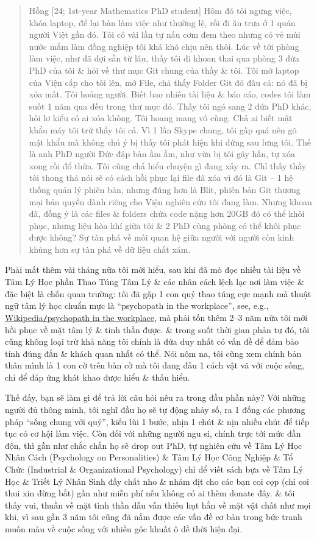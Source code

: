 \documentclass[12pt,twoside]{book}
\begin{document}
\begin{quote}
	{\sf Hồng [24; 1st-year Mathematics PhD student]} Hôm đó tôi ngưng việc, khóa laptop, để lại bàn làm việc  như thường lệ, rồi đi ăn trưa ở 1 quán người Việt gần đó. Tôi có vài lần tự nấu cơm đem theo nhưng có vẻ mùi nước mắm làm đồng nghiệp tôi khá khó chịu nên thôi. Lúc về tới phòng làm việc, như đã đợi sẵn từ lâu, thầy tôi đi khoan thai qua phòng 3 đứa PhD của tôi \& hỏi về thư mục Git chung của thầy \& tôi. Tôi mở laptop của Viện cấp cho tôi lên, mở File, chả thấy Folder Git đó đâu cả: nó đã bị xóa mất. Tôi hoảng người. Biết bao nhiêu tài liệu \& báo cáo, codes tôi làm suốt 1 năm qua đều trong thư mục đó. Thầy tôi ngó sang 2 đứa PhD khác, hỏi lơ kiểu có ai xóa không. Tôi hoang mang vô cùng. Chả ai biết mật khẩu máy tôi trừ thầy tôi cả. Vì 1 lần Skype chung, tôi gấp quá nên gõ mật khẩu mà không chú ý bị thầy tôi phát hiện khi đứng sau lưng tôi. Thế là anh PhD người Đức đập bàn ầm ầm, như vừa bị tôi gây hấn, tự xóa xong rồi đổ thừa. Tôi cũng chả hiểu chuyện gì đang xảy ra. Chỉ thấy thầy tôi thong thả nói sẽ có cách hồi phục lại file đã xóa vì đó là Git -- 1 hệ thống quản lý phiên bản, nhưng đúng hơn là Blit, phiên bản Git thương mại bản quyền dành riêng cho Viện nghiên cứu tôi đang làm. Nhưng khoan đã, đồng ý là các files \& folders chứa code nặng hơn 20GB đó có thể khôi phục, nhưng liệu hòa khí giữa tôi \& 2 PhD cùng phòng có thể khôi phục được không? Sự tàn phá về mối quan hệ giữa người với người còn kinh khủng hơn sự tàn phá về dữ liệu chất xám.
\end{quote}
Phải mất thêm vài tháng nữa tôi mới hiểu, sau khi đã mò đọc nhiều tài liệu về Tâm Lý Học phần Thao Túng Tâm Lý \& các nhân cách lệch lạc nơi làm việc \& đặc biệt là chốn quan trường: tôi đã gặp 1 con quỷ thao túng cực mạnh mà thuật ngữ tâm lý học chuẩn mực là ``psychopath in the workplace'', see, e.g., \href{https://en.wikipedia.org/wiki/Psychopathy_in_the_workplace}{Wikipedia{\tt/}psychopath in the workplace}, mà phải tốn thêm 2--3 năm nữa tôi mới hồi phục về mặt tâm lý \& tinh thần được. \& trong suốt thời gian phản tư đó, tôi cũng không loại trừ khả năng tôi chính là đứa duy nhất có vấn đề để đảm bảo tính đúng đắn \& khách quan nhất có thể. Nói nôm na, tôi cũng xem chính bản thân mình là 1 con cờ trên bàn cờ mà tôi đang đấu 1 cách vật vã với cuộc sống, chỉ để đáp ứng khát khao được hiểu \& thấu hiểu.

Thế đấy, bạn sẽ làm gì để trả lời câu hỏi nêu ra trong đầu phần này? Với những người đủ thông minh, tôi nghĩ đầu họ sẽ tự động nhảy số, ra 1 đống các phương pháp ``sống chung với quỷ'', kiểu lùi 1 bước, nhịn 1 chút \& nịn nhiều chút để tiếp tục có cơ hội làm việc. Còn đối với những người ngu si, chính trực tới mức đần độn, thì gần như chắc chắn họ sẽ drop out PhD, tự nghiên cứu về Tâm Lý Học Nhân Cách (Psychology on Personalities) \& Tâm Lý Học Công Nghiệp \& Tổ Chức (Industrial \& Organizational Psychology) chỉ để viết sách bựa về Tâm Lý Học \& Triết Lý Nhân Sinh đầy chất nho \& nhảm địt cho các bạn coi cọp (chỉ coi thui xin đừng bắt) gần như miễn phí nếu không có ai thèm donate đây. \& tôi thấy vui, thuần về mặt tình thần dẫu vẫn thiếu hụt hẳn về mặt vật chất như mọi khi, vì sau gần 3 năm tôi cũng đã nắm được các vấn đề cơ bản trong bức tranh muôn màu về cuộc sống với nhiều góc khuất ô dề thời hiện đại.
\end{document}
